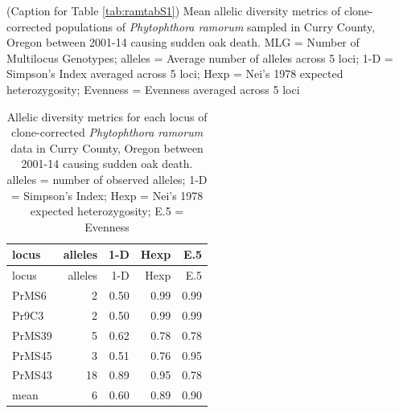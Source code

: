 \documentclass[double,12pt]{beavtex}
\begin{document}
  \begin{table}[ph!]
  \caption[Caption for Table \ref{tab:ramtabS1}]{(Caption for Table 
  \ref{tab:ramtabS1}) Mean allelic diversity metrics of
  clone-corrected populations of \emph{Phytophthora ramorum} sampled in
  Curry County, Oregon between 2001-14 causing sudden oak death. MLG =
  Number of Multilocus Genotypes; alleles = Average number of alleles
  across 5 loci; 1-D = Simpson's Index averaged across 5 loci; Hexp =
  Nei's 1978 expected heterozygosity; Evenness = Evenness averaged across
  5 loci}
  \label{cap:ramcapS1}
  \end{table}\vspace*{\fill}
  
  \renewcommand{\tablename}{Supplementary Table}
  \renewcommand{\thetable}{\arabic{chapter}.S\arabic{table}}
  
  
  \newpage
  
  \begin{longtable}[]{@{}lrrrr@{}}
  \caption{\label{tab:ramtabS2} Allelic diversity metrics for each locus of
  clone-corrected \emph{Phytophthora ramorum} data in Curry County, Oregon
  between 2001-14 causing sudden oak death. alleles = number of observed
  alleles; 1-D = Simpson's Index; Hexp = Nei's 1978 expected
  heterozygosity; E.5 = Evenness}\tabularnewline
  \toprule
  locus & alleles & 1-D & Hexp & E.5\tabularnewline
  \midrule
  \endfirsthead
  \toprule
  locus & alleles & 1-D & Hexp & E.5\tabularnewline
  \midrule
  \endhead
  PrMS6 & 2 & 0.50 & 0.99 & 0.99\tabularnewline
  Pr9C3 & 2 & 0.50 & 0.99 & 0.99\tabularnewline
  PrMS39 & 5 & 0.62 & 0.78 & 0.78\tabularnewline
  PrMS45 & 3 & 0.51 & 0.76 & 0.95\tabularnewline
  PrMS43 & 18 & 0.89 & 0.95 & 0.78\tabularnewline
  mean & 6 & 0.60 & 0.89 & 0.90\tabularnewline
  \bottomrule
  \end{longtable}
  
\end{document}
